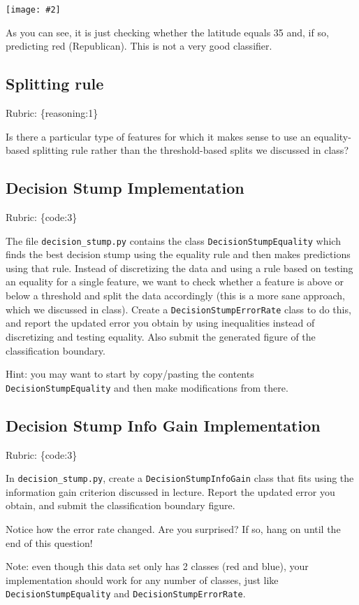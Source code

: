 \documentclass{article}
\def\rubric#1{\gre{Rubric: \{#1\}}}{}
\def\blu#1{{\color{blu}#1}}
\def\gre#1{{\color{gre}#1}}
\newcommand{\centerfig}[2]{\begin{center}\texttt{[image: \#2]}\end{center}}
\begin{document}
\centerfig{0.7}{../figs/q6_decisionBoundary}

As you can see, it is just checking whether the latitude equals 35 and, if so, predicting red (Republican).
This is not a very good classifier. 

\subsection{Splitting rule}
\rubric{reasoning:1}

Is there a particular type of features for which it makes sense to use an equality-based splitting rule rather than the threshold-based splits we discussed in class?

\subsection{Decision Stump Implementation}
\rubric{code:3}

The file \texttt{decision\string_stump.py} contains the class \texttt{DecisionStumpEquality} which 
finds the best decision stump using the equality rule and then makes predictions using that
rule. Instead of discretizing the data and using a rule based on testing an equality for 
a single feature, we want to check whether a feature is above or below a threshold and 
split the data accordingly (this is a more sane approach, which we discussed in class). 
\blu{Create a \texttt{DecisionStumpErrorRate} class to do this, and report the updated error you 
obtain by using inequalities instead of discretizing and testing equality. Also submit the generated figure of the classification boundary.}

Hint: you may want to start by copy/pasting the contents \texttt{DecisionStumpEquality} and then make modifications from there. 


\subsection{Decision Stump Info Gain Implementation}
\rubric{code:3}

In \texttt{decision\string_stump.py}, \blu{create a \texttt{DecisionStumpInfoGain} class that 
fits using the information gain criterion discussed in lecture. Report the updated error you obtain, and submit the classification boundary figure.}

Notice how the error rate changed. Are you surprised? If so, hang on until the end of this question!

Note: even though this data set only has 2 classes (red and blue), your implementation should work 
for any number of classes, just like \texttt{DecisionStumpEquality} and \texttt{DecisionStumpErrorRate}.
\end{document}
